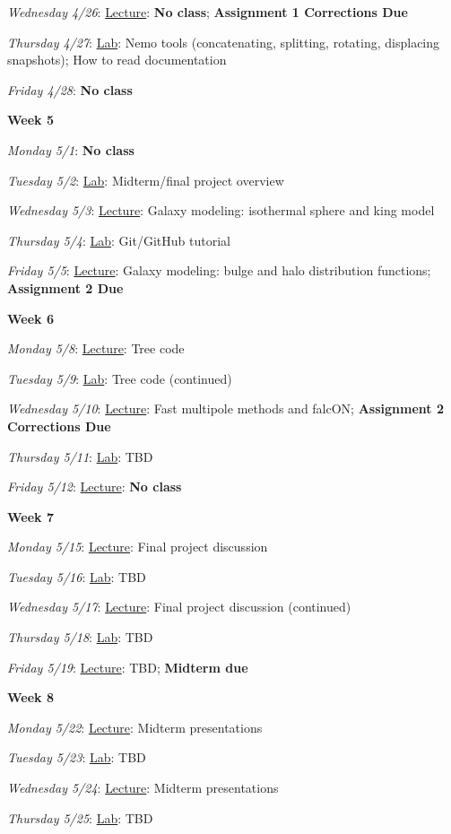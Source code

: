 \documentclass[12pt]{article}
\begin{document}
\emph{Wednesday 4/26}: \underline{Lecture}: \textbf{No class}; \textbf{Assignment 1 Corrections Due}

\emph{Thursday 4/27}: \underline{Lab}: Nemo tools (concatenating, splitting, rotating, displacing snapshots); How to read documentation

\emph{Friday 4/28}: \textbf{No class}

\noindent\textbf{Week 5}

\emph{Monday 5/1}: \textbf{No class}

\emph{Tuesday 5/2}: \underline{Lab}: Midterm/final project overview

\emph{Wednesday 5/3}: \underline{Lecture}: Galaxy modeling: isothermal sphere and king model

\emph{Thursday 5/4}: \underline{Lab}: Git/GitHub tutorial

\emph{Friday 5/5}: \underline{Lecture}: Galaxy modeling: bulge and halo distribution functions; \textbf{Assignment 2 Due}

\noindent\textbf{Week 6}

\emph{Monday 5/8}: \underline{Lecture}: Tree code

\emph{Tuesday 5/9}: \underline{Lab}: Tree code (continued)

\emph{Wednesday 5/10}: \underline{Lecture}: Fast multipole methods and falcON; \textbf{Assignment 2 Corrections Due}

\emph{Thursday 5/11}: \underline{Lab}: TBD

\emph{Friday 5/12}: \underline{Lecture}: \textbf{No class}

\noindent\textbf{Week 7}

\emph{Monday 5/15}: \underline{Lecture}: Final project discussion

\emph{Tuesday 5/16}: \underline{Lab}: TBD

\emph{Wednesday 5/17}: \underline{Lecture}: Final project discussion (continued)

\emph{Thursday 5/18}: \underline{Lab}: TBD

\emph{Friday 5/19}: \underline{Lecture}: TBD; \textbf{Midterm due}

\noindent\textbf{Week 8}

\emph{Monday 5/22}: \underline{Lecture}: Midterm presentations

\emph{Tuesday 5/23}: \underline{Lab}: TBD

\emph{Wednesday 5/24}: \underline{Lecture}: Midterm presentations

\emph{Thursday 5/25}: \underline{Lab}: TBD
\end{document}
